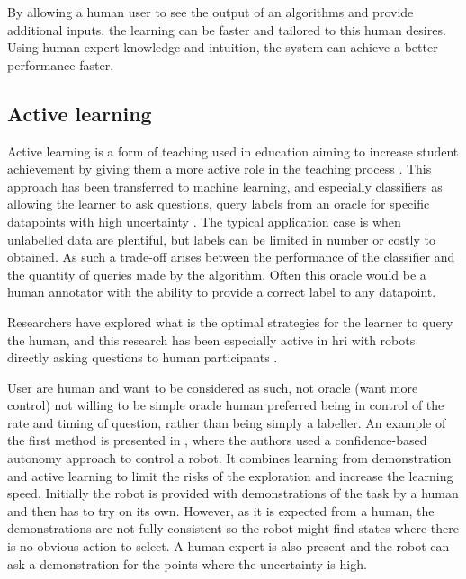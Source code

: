 By allowing a human user to see the output of an algorithms and provide additional inputs, the learning can be faster and tailored to this human desires. Using human expert knowledge and intuition, the system can achieve a better performance faster.

\subsection{Active learning} \label{ssec:back_active}

Active learning is a form of teaching used in education aiming to increase student achievement by giving them a more active role in the teaching process \citep{johnson1991active}. This approach has been transferred to machine learning, and especially classifiers as allowing the learner to ask questions, query labels from an oracle for specific datapoints with high uncertainty \citep{settles2012active}. The typical application case is when unlabelled data are plentiful, but labels can be limited in number or costly to obtained. As such a trade-off arises between the performance of the classifier and the quantity of queries made by the algorithm. Often this oracle would be a human annotator with the ability to provide a correct label to any datapoint.

Researchers have explored what is the optimal strategies for the learner to query the human, and this research has been especially active in \gls{hri} with robots directly asking questions to human participants \citep{chao2010transparent}. \cite{cakmak2010designing}


User are human and want to be considered as such, not oracle (want more control) not willing to be simple oracle \cite{cakmak2010designing} %
human preferred being in control of the rate and timing of question, rather than being simply a labeller.
An example of the first method is presented in \citet{chernova2009}, where the authors used a confidence-based autonomy approach to control a robot. It combines learning from demonstration and active learning \citep{johnson1991active} to limit the risks of the exploration and increase the learning speed. Initially the robot is provided with demonstrations of the task by a human and then has to try on its own. However, as it is expected from a human, the demonstrations are not fully consistent so the robot might find states where there is no obvious action to select. A human expert is also present and the robot can ask a demonstration for the points where the uncertainty is high.

